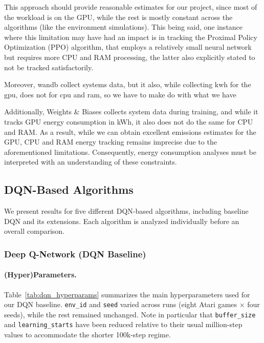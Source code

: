 This approach should provide reasonable estimates for our project, since most of the workload is on the GPU, while the rest is mostly constant across the algorithms (like the environment simulations). This being said, one instance where this limitation may have had an impact is in tracking the Proximal Policy Optimization (PPO) algorithm, that employs a relatively small neural network but requires more CPU and RAM processing, the latter also explicitly stated to not be tracked satisfactorily.

Moreover, wandb collect systems data, but it also, while collecting kwh for the gpu, does not for cpu and ram, so we have to make do with what we have

Additionally, Weights \& Biases collects system data during training, and while it tracks GPU energy consumption in kWh, it also does not do the same for CPU and RAM. As a result, while we can obtain excellent emissions estimates for the GPU, CPU and RAM energy tracking remains imprecise due to the aforementioned limitations. Consequently, energy consumption analyses must be interpreted with an understanding of these constraints.

\subsection{DQN-Based Algorithms}
We present results for five different DQN-based algorithms, including baseline DQN and its extensions. Each algorithm is analyzed individually before an overall comparison.
\subsubsection{Deep Q-Network (DQN Baseline)}
\label{subsubsec:dqn_baseline}

\paragraph{(Hyper)Parameters.}
Table~\ref{tab:dqn_hyperparams} summarizes the main hyperparameters used for our DQN baseline.  
\texttt{env\_id} and \texttt{seed} varied across runs (eight Atari games $\times$ four seeds), 
while the rest remained unchanged. Note in particular that \texttt{buffer\_size} and 
\texttt{learning\_starts} have been reduced relative to their usual million-step values to 
accommodate the shorter 100k-step regime.

